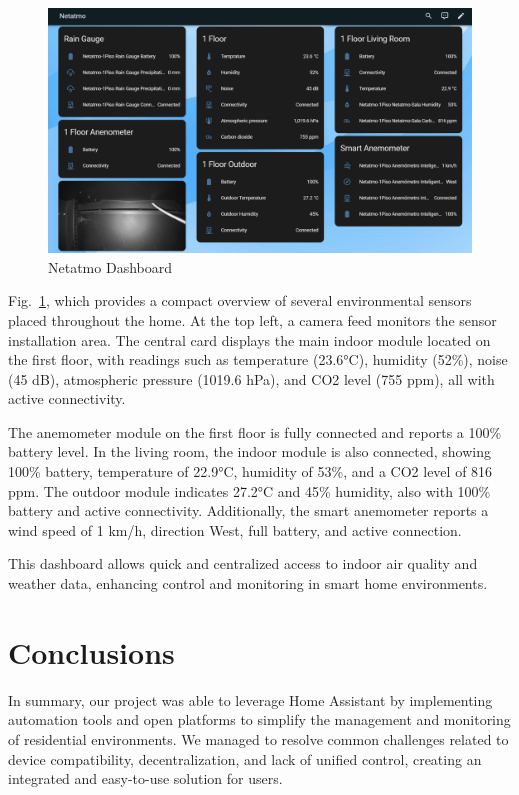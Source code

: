\documentclass[graybox]{svmult}
\begin{document}
\begin{figure}[H] 
	\centering
	\includegraphics[width=\textwidth]{netatmo.png}
	\caption{Netatmo Dashboard}
	\label{fig:netatmo}
\end{figure}

Fig.~\ref{fig:netatmo}, which provides a compact overview of several environmental sensors placed throughout the home. At the top left, a camera feed monitors the sensor installation area. The central card displays the main indoor module located on the first floor, with readings such as temperature (23.6°C), humidity (52\%), noise (45 dB), atmospheric pressure (1019.6 hPa), and CO2 level (755 ppm), all with active connectivity.

The anemometer module on the first floor is fully connected and reports a 100\% battery level. In the living room, the indoor module is also connected, showing 100\% battery, temperature of 22.9°C, humidity of 53\%, and a CO2 level of 816 ppm. The outdoor module indicates 27.2°C and 45\% humidity, also with 100\% battery and active connectivity. Additionally, the smart anemometer reports a wind speed of 1 km/h, direction West, full battery, and active connection.

This dashboard allows quick and centralized access to indoor air quality and weather data, enhancing control and monitoring in smart home environments.

 

\section{Conclusions}\label{sec:Conclusion}

In summary, our project was able to leverage Home Assistant by implementing automation tools and open platforms to simplify the management and monitoring of residential environments. We managed to resolve common challenges related to device compatibility, decentralization, and lack of unified control, creating an integrated and easy-to-use solution for users.
\end{document}

